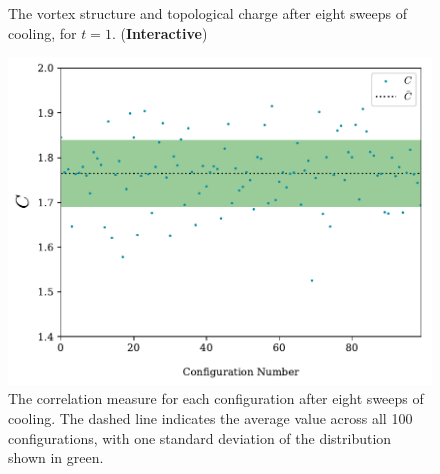 %
\begin{figure}[H]
\centering
{}

\caption{\label{fig:PlaqLinkTopQ_SW8}The vortex structure and topological charge after eight sweeps of cooling, for $t=1$. (\textbf{Interactive})}
\end{figure}
%
\begin{figure}[H]
\centering
\includegraphics[width=0.75\linewidth]{./Correlation_sw07.pdf}
\caption[The correlation measure for each configuration after eight sweeps of cooling.]{\label{fig:Correlation_sw07}The correlation measure for each configuration after eight sweeps of cooling. The dashed line indicates the average value across all 100 configurations, with one standard deviation of the distribution shown in green.}
\end{figure}

